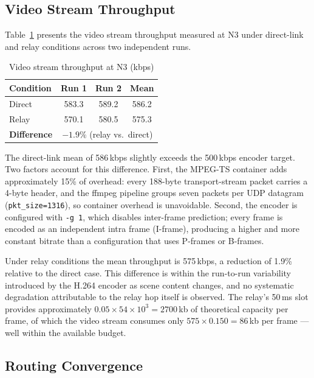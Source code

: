 \subsection{Video Stream Throughput}
\label{subsec:res-throughput}

Table~\ref{tab:throughput} presents the video stream throughput measured
at N3 under direct-link and relay conditions across two independent runs.

\begin{table}[h]
\centering
\caption{Video stream throughput at N3 (kbps)}
\label{tab:throughput}
\begin{tabular}{lccc}
\toprule
\textbf{Condition} & \textbf{Run 1} & \textbf{Run 2} & \textbf{Mean} \\
\midrule
Direct & 583.3 & 589.2 & 586.2 \\
Relay  & 570.1 & 580.5 & 575.3 \\
\midrule
\textbf{Difference} & \multicolumn{3}{c}{$-1.9\%$ (relay vs.\ direct)} \\
\bottomrule
\end{tabular}
\end{table}

The direct-link mean of 586\,kbps slightly exceeds the 500\,kbps encoder
target. Two factors account for this difference. First, the MPEG-TS
container adds approximately 15\% of overhead: every 188-byte
transport-stream packet carries a 4-byte header, and the ffmpeg pipeline
groups seven packets per UDP datagram (\texttt{pkt\_size=1316}), so
container overhead is unavoidable. Second, the encoder is configured with
\texttt{-g~1}, which disables inter-frame prediction; every frame is
encoded as an independent intra frame (I-frame), producing a higher and
more constant bitrate than a configuration that uses P-frames or B-frames.

Under relay conditions the mean throughput is 575\,kbps, a reduction of
1.9\% relative to the direct case. This difference is within the
run-to-run variability introduced by the H.264 encoder as scene content
changes, and no systematic degradation attributable to the relay hop
itself is observed. The relay's 50\,ms slot provides approximately
$0.05 \times 54 \times 10^3 = 2700$\,kb of theoretical capacity per frame,
of which the video stream consumes only $575 \times 0.150 = 86$\,kb per
frame --- well within the available budget.

\subsection{Routing Convergence}
\label{subsec:res-convergence}

